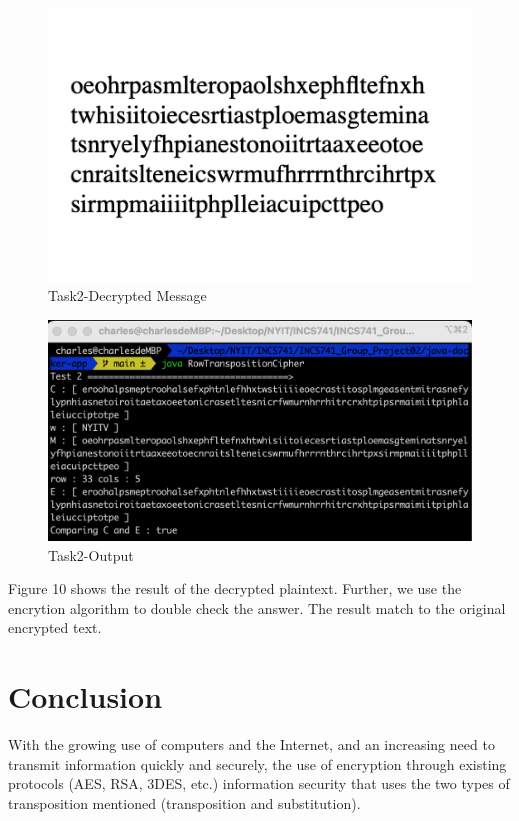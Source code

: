 \documentclass[twoside,twocolumn]{article}
\begin{document}
\begin{figure}[H]
  \centering
  \includegraphics[scale=0.75]{./Graphs/Figure1.9.png}
  \caption{Task2-Decrypted Message}
  \label{fig:testfig1}
\end{figure}
\begin{figure}[H]
  \centering
  \includegraphics[scale=0.36]{./Graphs/Figure2.0.png}
  \caption{Task2-Output}
  \label{fig:testfig1}
\end{figure}

Figure 10 shows the result of the decrypted plaintext. Further, we use the encrytion algorithm to double check the answer. The result match to the original encrypted text.

\section{Conclusion}

With the growing use of computers and the Internet, and an increasing need to transmit information quickly and securely, the use of encryption through existing protocols (AES, RSA, 3DES, etc.) information security that uses the two types of transposition mentioned (transposition and substitution).
\end{document}
